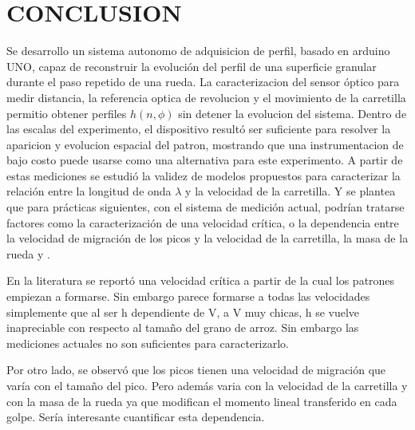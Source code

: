\section{CONCLUSION}

Se desarrollo un sistema autonomo de adquisicion de perfil, basado en arduino UNO, capaz de reconstruir la evolución del perfil de una superficie granular durante 
el paso repetido de una rueda.
La caracterizacion del sensor óptico para medir distancia, la referencia optica de revolucion y el movimiento de la carretilla permitio obtener perfiles $h(n,\phi)$ sin detener la evolucion del sistema.
Dentro de las escalas del experimento, el dispositivo resultó ser suficiente para resolver la aparicion y evolucion espacial del patron, mostrando que una instrumentacion de bajo costo puede usarse como
una alternativa para este experimento. 
A partir de estas mediciones se estudió la validez de modelos propuestos para caracterizar la relación entre 
la longitud de onda $\lambda$ y la velocidad de la carretilla. Y se plantea que para prácticas siguientes,
con el sistema de medición actual, podrían 
tratarse factores como la caracterización de una velocidad crítica, o la dependencia entre la velocidad de 
migración de los picos y la velocidad de la carretilla, la masa de la rueda y .

En la literatura se reportó una velocidad crítica a partir de la cual
los patrones empiezan a formarse. Sin embargo parece formarse a todas las
velocidades simplemente que al ser h dependiente de V, a V muy chicas, h se
vuelve inapreciable con respecto al tamaño del grano de arroz. Sin embargo 
las mediciones actuales no son suficientes para caracterizarlo.

Por otro lado, se observó que los picos tienen una velocidad de migración
que varía con el tamaño del pico. Pero además varia
con la velocidad de la carretilla y con la masa de la rueda ya que modifican
el momento lineal transferido en cada golpe. Sería interesante cuantificar esta dependencia. 
